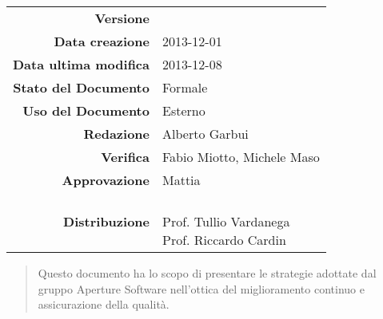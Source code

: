 


\newcommand{\Versione}{\versionePianoDiQualifica{}}	%
\newcommand{\Data}{2013-12-01}						%
\newcommand{\DataUltimaModifica}{2013-12-08}
\newcommand{\TipoDocumento}{Piano di Qualifica}		%




\begin{center}
\begin{tabular}{r|l}
\textbf{Versione} & \Versione{} \\
\textbf{Data creazione} & \Data{} \\
\textbf{Data ultima modifica} & \DataUltimaModifica{} \\
\textbf{Stato del Documento} & Formale \\		%
\textbf{Uso del Documento} & Esterno \\			%
\textbf{Redazione} & Alberto Garbui\\			%
\textbf{Verifica} & Fabio Miotto, Michele Maso\\%
\textbf{Approvazione} & Mattia\\				%
\textbf{Distribuzione} & \parbox[t]{4cm}{\NomeGruppo{} \\ Prof. Tullio Vardanega \\ Prof. Riccardo Cardin \\ \Prop{} }\\
\end{tabular}
\end{center}

\vspace{0.05in}

\begin{abstract}
\begin{center}
Questo documento ha lo scopo di presentare le strategie adottate dal gruppo Aperture Software nell’ottica del miglioramento continuo e assicurazione della qualità.
\end{center}
\end{abstract}

